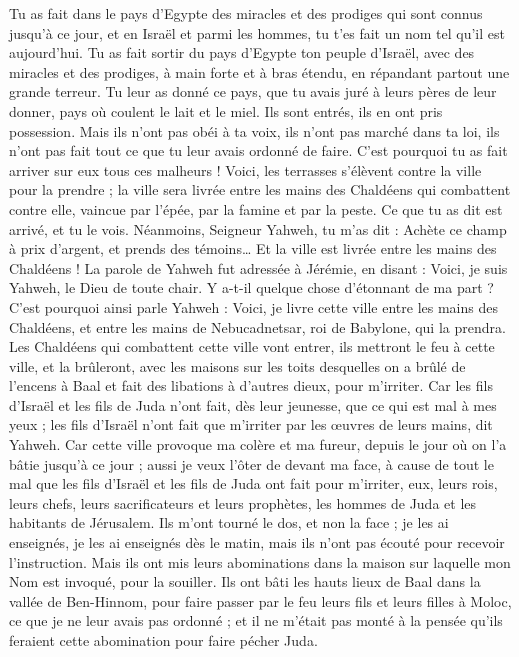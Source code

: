 \begin{multicols}{2}
Tu as fait dans le pays d'Egypte des miracles et des prodiges qui sont connus jusqu’à ce jour, et en Israël et parmi les hommes, tu t'es fait un nom tel qu'il est aujourd'hui.
Tu as fait sortir du pays d'Egypte ton peuple d’Israël, avec des miracles et des prodiges, à main forte et à bras étendu, en répandant partout une grande terreur.
Tu leur as donné ce pays, que tu avais juré à leurs pères de leur donner, pays où coulent le lait et le miel.
Ils sont entrés, ils en ont pris possession. Mais ils n'ont pas obéi à ta voix, ils n'ont pas marché dans ta loi, ils n'ont pas fait tout ce que tu leur avais ordonné de faire. C'est pourquoi tu as fait arriver sur eux tous ces malheurs !
Voici, les terrasses s’élèvent contre la ville pour la prendre ; la ville sera livrée entre les mains des Chaldéens qui combattent contre elle, vaincue par l'épée, par la famine et par la peste. Ce que tu as dit est arrivé, et tu le vois.
Néanmoins, Seigneur Yahweh, tu m'as dit : Achète ce champ à prix d'argent, et prends des témoins… Et la ville est livrée entre les mains des Chaldéens !
La parole de Yahweh fut adressée à Jérémie, en disant :
Voici, je suis Yahweh, le Dieu de toute chair. Y a-t-il quelque chose d’étonnant de ma part ?
C'est pourquoi ainsi parle Yahweh : Voici, je livre cette ville entre les mains des Chaldéens, et entre les mains de Nebucadnetsar, roi de Babylone, qui la prendra.
Les Chaldéens qui combattent cette ville vont entrer, ils mettront le feu à cette ville, et la brûleront, avec les maisons sur les toits desquelles on a brûlé de l’encens à Baal et fait des libations à d'autres dieux, pour m’irriter.
Car les fils d'Israël et les fils de Juda n'ont fait, dès leur jeunesse, que ce qui est mal à mes yeux ; les fils d'Israël n’ont fait que m’irriter par les œuvres de leurs mains, dit Yahweh.
Car cette ville provoque ma colère et ma fureur, depuis le jour où on l'a bâtie jusqu’à ce jour ; aussi je veux l'ôter de devant ma face,
à cause de tout le mal que les fils d'Israël et les fils de Juda ont fait pour m’irriter, eux, leurs rois, leurs chefs, leurs sacrificateurs et leurs prophètes, les hommes de Juda et les habitants de Jérusalem.
Ils m'ont tourné le dos, et non la face ; je les ai enseignés, je les ai enseignés dès le matin, mais ils n'ont pas écouté pour recevoir l’instruction.
Mais ils ont mis leurs abominations dans la maison sur laquelle mon Nom est invoqué, pour la souiller.
Ils ont bâti les hauts lieux de Baal dans la vallée de Ben-Hinnom, pour faire passer par le feu leurs fils et leurs filles à Moloc, ce que je ne leur avais pas ordonné ; et il ne m'était pas monté à la pensée qu'ils feraient cette abomination pour faire pécher Juda.

\end{multicols}
